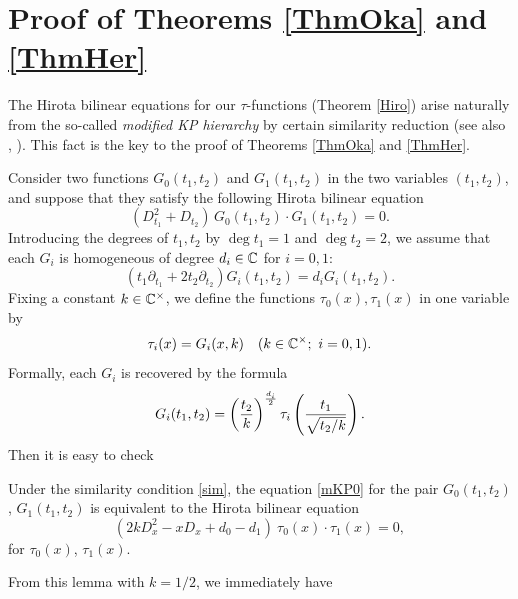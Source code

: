\section{Proof of Theorems  \ref{ThmOka} and \ref{ThmHer}}
The Hirota bilinear equations for our $\tau$-functions (Theorem \ref{Hiro})
arise naturally from the so-called {\em modified KP hierarchy}
\cite{JM} by certain similarity reduction (see also \cite{NT}, \cite{QNC}). 
This fact is the key to the proof of Theorems \ref{ThmOka} and \ref{ThmHer}. 
\par\medskip
Consider two functions $G_0(t_1,t_2)$ and $G_1(t_1,t_2)$ in 
the two variables $(t_1,t_2)$, and suppose that they 
satisfy the following Hirota bilinear equation
\begin{equation}
\label{mKP0}
(D_{t_1}^2+D_{t_2}) \, G_0(t_1,t_2) \cdot G_1(t_1,t_2) =0. 
\end{equation}
Introducing the degrees of $t_1,t_2$ by $\deg t_1=1$ and 
$\deg t_2=2$,
we assume that each $G_i$ is homogeneous of degree $d_i\in {\Bbb C}$ 
for $i=0,1$:
\begin{equation}\label{sim}
(t_1\partial_{t_1}+2 t_2\partial_{t_2}) G_i(t_1,t_2)=d_i G_i(t_1,t_2). 
\end{equation}
Fixing a constant $k\in{\Bbb C}^\times$, 
we define the functions $\tau_0(x),\tau_1(x)$ in one variable by
\begin{equation}
\tau_i(x)=G_i(x,k)\quad (k\in {\Bbb C^\times}; \ i=0,1). 
\end{equation}
Formally,  each $G_i$ is recovered by the formula
\begin{equation}
G_i(t_1,t_2)= \left(\frac{t_2}{k}\right)^{d_i \over 2} 
\tau_i\left(\frac{t_1}{\sqrt{t_2/k}}\right).
\end{equation}
Then it is easy to check 
\begin{lem}\label{s-reduction}\label{Lem51}
Under the similarity condition \eqref{sim}, the equation \eqref{mKP0}
for the pair $G_0(t_1,t_2)$, $G_1(t_1,t_2)$ is equivalent to the Hirota 
bilinear equation 
\begin{equation}
\left(2k D_x^2 -xD_x+d_0-d_1\right)\ \tau_0(x)\cdot\tau_1(x)=0, 
\end{equation}
for $\tau_0(x)$, $\tau_1(x)$. 
\end{lem}
{}From this lemma with $k=1/2$, we immediately have

